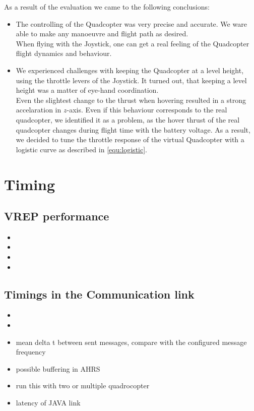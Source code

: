 As a result of the evaluation we came to the following conclusions:

\begin{itemize}
\item{The controlling of the Quadcopter was very precise and accurate. 
We ware able to make any manoeuvre and flight path as desired. \\ 

When flying with the Joystick, one can get a real feeling of the Quadcopter flight dynamics and behaviour}.

\item{We experienced challenges with keeping the Quadcopter at a level height, using the throttle levers of the Joystick. 
It turned out, that keeping a level height was a matter of eye-hand coordination. \\

Even the slightest change to the thrust when hovering resulted in a strong accelaration in $z$-axis. 
Even if this behaviour corresponds to the real quadcopter, we identified it as a problem, as the hover thrust of the real quadcopter changes during flight time with the battery voltage. 
As a result, we decided to tune the throttle response of the virtual Quadcopter with a logistic curve as described in \ref{equ:logistic}}.

\end{itemize}

\section{Timing}
\subsection{VREP performance}
\begin{itemize}
\item{}
\item{}
\item{}
\item{}
\end{itemize}


\subsection{Timings in the Communication link}
\label{sec:commTiming}
\begin{itemize}
\item{}
\item{}
\item{mean delta t between sent messages, compare with the configured message frequency}
\item{possible buffering in AHRS}
\item{ run this with two or multiple quadrocopter}
\item{latency of JAVA link}
\end{itemize}

